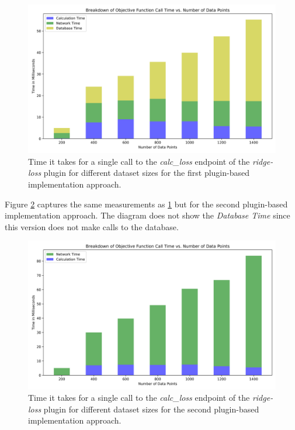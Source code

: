 \documentclass[
  a4paper,  %
  twoside,  %
  bibliography=totoc,
  headsepline,
  cleardoublepage=empty,
  parskip=half,
  draft=false
]{scrbook}
\begin{document}
\begin{figure}
  \centering
  \includegraphics[width=\textwidth]{graphics/of_call_times_version1.png}
  \caption{Time it takes for a single call to the \emph{calc\_loss} endpoint of the \emph{ridge-loss} plugin for different dataset sizes for the first plugin-based implementation approach.}
  \label{fig:of_call_time_version1}
\end{figure}

Figure \ref{fig:of_call_time_version2} captures the same measurements as \ref{fig:of_call_time_version1} but for the second plugin-based implementation approach.
The diagram does not show the \emph{Database Time} since this version does not make calls to the database.

\begin{figure}
  \centering
  \includegraphics[width=\textwidth]{graphics/of_call_times_version2.png}
  \caption{Time it takes for a single call to the \emph{calc\_loss} endpoint of the \emph{ridge-loss} plugin for different dataset sizes for the second plugin-based implementation approach.}
  \label{fig:of_call_time_version2}
\end{figure}
\end{document}
